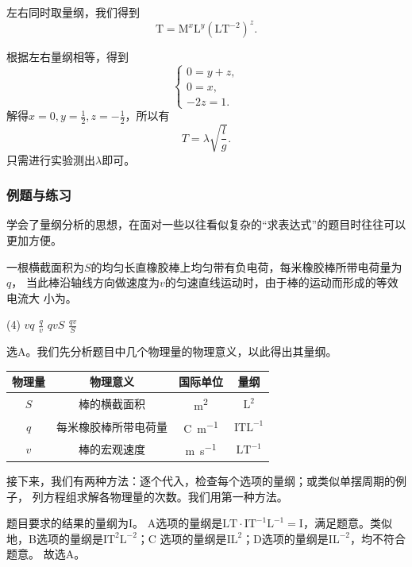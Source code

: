 左右同时取量纲，我们得到
\[
    \mathrm{T} = \mathrm{M}^{x}\mathrm{L}^{y}\left( \mathrm{LT}^{-2} \right)^{z} 
.\] 

根据左右量纲相等，得到
\[
    \begin{cases}
        0=y+z,\\
        0=x,\\
        -2z=1.
    \end{cases}
\] 
解得$x=0,y=\frac{1}{2},z=-\frac{1}{2}$，所以有
\[
    T = \lambda \sqrt{\frac{l}{g}} 
.\] 
只需进行实验测出$\lambda$即可。

\subsubsection{例题与练习}

学会了量纲分析的思想，在面对一些以往看似复杂的“求表达式”的题目时往往可以更加方便。

\begin{rawexp}\label{exp:current_expl}
    一根横截面积为$S$的均匀长直橡胶棒上均匀带有负电荷，每米橡胶棒所带电荷量为$q$，
    当此棒沿轴线方向做速度为$v$的匀速直线运动时，由于棒的运动而形成的等效电流大
    小为\choiceblank。

    \begin{tasks}(4)
        \task $vq$
        \task $\frac{q}{v}$
        \task $qvS$
        \task $\frac{qv}{S}$
    \end{tasks}
\end{rawexp}

\begin{rawsol}
    选A。我们先分析题目中几个物理量的物理意义，以此得出其量纲。

    \begin{table}[H]
        \centering
        \begin{tabular}{cccc}
            \toprule
            物理量 & 物理意义 & 国际单位 & 量纲 \\
            \midrule
            $S$ & 棒的横截面积 & \unit{\square\metre} & $\mathrm{L^2}$ \\
            $q$ & 每米橡胶棒所带电荷量 & \unit{\coulomb\per\metre} & 
            $\mathrm{ITL^{-1}}$ \\
            $v$ & 棒的宏观速度 & \unit{\meter\per\second} & $\mathrm{LT^{-1}}$ 
            \\
            \bottomrule
        \end{tabular}
    \end{table}
    
    接下来，我们有两种方法：逐个代入，检查每个选项的量纲；或类似单摆周期的例子，
    列方程组求解各物理量的次数。我们用第一种方法。

    题目要求的结果的量纲为$\mathrm{I}$。 A选项的量纲是$\mathrm{LT\cdot%
    IT^{-1}L^{-1} = I}$，满足题意。类似地，B选项的量纲是$\mathrm{IT^2L^{-2}}$；C
    选项的量纲是$\mathrm{IL^2}$；D选项的量纲是$\mathrm{IL^{-2}}$，均不符合题意。
    故选A。
\end{rawsol}

